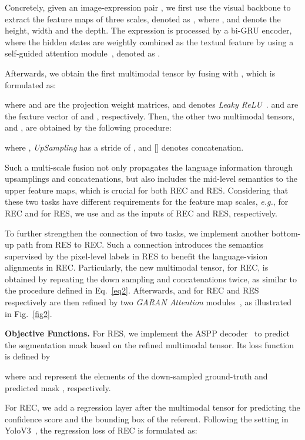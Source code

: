 \documentclass[10pt,twocolumn,letterpaper]{article}
\begin{document}
Concretely, given an image-expression pair ,  we first use the visual backbone to  extract the  feature maps of three scales, denoted as ,  where ,  and  denote the height, width and the depth.  The expression is processed by a bi-GRU encoder, where the  hidden states are weightly combined as the textual feature by using a self-guided attention module~\cite{yang2016hierarchical}, denoted as .  

Afterwards, we   obtain the first multimodal tensor by fusing  with , which is formulated as:

where   and  are the projection weight matrices, and  denotes  \emph{Leaky ReLU}~\cite{LRELU}.
 and  are the feature vector of  and , respectively. Then, the other two multimodal tensors,  and , are obtained by the following procedure: 

where , \emph{UpSampling} has a stride of ,   and [] denotes concatenation. 

Such a multi-scale fusion   not only propagates the language information through upsamplings and concatenations, but also  includes the mid-level semantics to the upper feature maps, which is crucial for both REC and RES. Considering that these two tasks have different requirements for the feature map scales, \emph{e.g.},  for REC  and  for RES, we use    and  as the inputs of REC and RES, respectively.

To further strengthen the connection of two tasks, we  implement another bottom-up path from RES to REC. 
Such a connection   introduces the semantics supervised by the pixel-level labels in RES to benefit the language-vision alignments in REC. Particularly, the new multimodal tensor,    for REC,  is obtained by repeating the down sampling and concatenations twice, as  similar to the procedure defined in Eq.~\ref{eq2}.  Afterwards,   and  for REC and RES   respectively are then refined by two \emph{GARAN Attention} modules~\cite{zhou2019GIN}, as illustrated in Fig.~\ref{fig2}.

\textbf{Objective Functions.}
For RES,  we implement the ASPP decoder~\cite{DEEPLAB} to predict the segmentation mask based on the refined multimodal tensor. Its loss function is defined by

where  and  represent the elements of the down-sampled   ground-truth  and  predicted mask ,  respectively. 


For REC, we add a regression layer after the multimodal tensor for predicting the confidence score and the bounding box of the referent. 
Following the setting in YoloV3~\cite{redmon2018yolov3:}, the regression loss of REC is formulated as:
\end{document}
